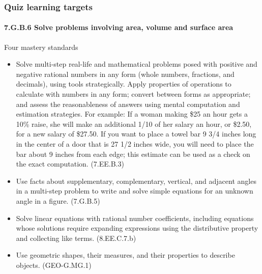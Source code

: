 \documentclass{beamer}
\begin{document}
\frame
{
  \frametitle{Quiz learning targets}
  \framesubtitle{7.G.B.6 Solve problems involving area, volume and surface area}

  \begin{block}{Four mastery standards}
    \begin{itemize}
    \item Solve multi-step real-life and mathematical problems posed with positive and negative rational numbers in any form (whole numbers, fractions, and decimals), using tools strategically. Apply properties of operations to calculate with numbers in any form; convert between forms as appropriate; and assess the reasonableness of answers using mental computation and estimation strategies. For example: If a woman making \$25 an hour gets a 10\% raise, she will make an additional 1/10 of her salary an hour, or \$2.50, for a new salary of \$27.50. If you want to place a towel bar 9 3/4 inches long in the center of a door that is 27 1/2 inches wide, you will need to place the bar about 9 inches from each edge; this estimate can be used as a check on the exact computation. (7.EE.B.3)
        
    \item Use facts about supplementary, complementary, vertical, and adjacent angles in a multi-step problem to write and solve simple equations for an unknown angle in a figure. (7.G.B.5)
    
    \item Solve linear equations with rational number coefficients, including equations whose solutions require expanding expressions using the distributive property and collecting like terms. (8.EE.C.7.b)
    
    \item Use geometric shapes, their measures, and their properties to describe objects. (GEO-G.MG.1)
    \end{itemize}
  \end{block}
}
  
\end{document}
